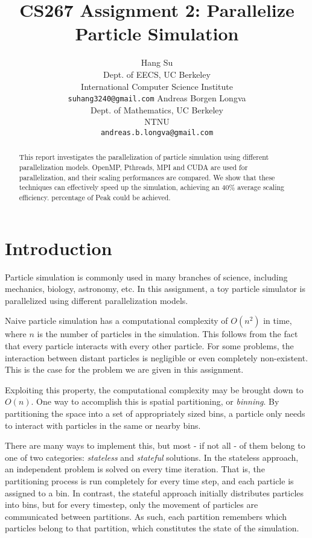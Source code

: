 \documentclass[11pt]{article}
\title{CS267 Assignment 2: Parallelize Particle Simulation}
\author{Hang Su \\
  Dept. of EECS, UC Berkeley \\
  International Computer Science Institute \\
  {\tt suhang3240@gmail.com}
  \And
  Andreas Borgen Longva \\
  Dept. of Mathematics, UC Berkeley \\
  NTNU \\
  {\tt andreas.b.longva@gmail.com}
}
\date{}
\begin{document}
\maketitle
\vspace{-8mm}
\begin{abstract}
This report investigates the parallelization of particle simulation using different parallelization models.
OpenMP, Pthreads, MPI and CUDA are used for parallelization, and their scaling performances are compared.
We show that these techniques can effectively speed up the simulation, achieving an 40\% average scaling efficiency.
percentage of Peak could be achieved.
\end{abstract}

\section{Introduction}
Particle simulation is commonly used in many branches of science, including mechanics, biology, astronomy, etc. In this assignment, a toy particle simulator is parallelized using different parallelization models.

Naive particle simulation has a computational complexity of $O(n^2)$ in time, where $n$ is the number of particles in the simulation. This follows from the fact that every particle interacts with every other particle. For some problems, the interaction between distant particles is negligible or even completely non-existent. This is the case for the problem we are given in this assignment.

Exploiting this property, the computational complexity may be brought down to $O(n)$. One way to accomplish this is spatial partitioning, or \emph{binning}. By partitioning the space into a set of appropriately sized bins, a particle only needs to interact with particles in the same or nearby bins.

There are many ways to implement this, but most - if not all - of them belong to one of two categories: \emph{stateless} and \emph{stateful} solutions. In the stateless approach, an independent problem is solved on every time iteration. That is, the partitioning process is run completely for every time step, and each particle is assigned to a bin. In contrast, the stateful approach initially distributes particles into bins, but for every timestep, only the movement of particles are communicated between partitions. As such, each partition remembers which particles belong to that partition, which constitutes the state of the simulation.
\end{document}
